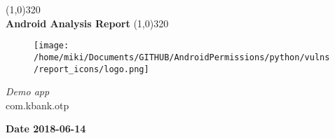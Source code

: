 \documentclass[12p]{article}
\begin{document}
\begin{titlepage}
\begin{center}
\line(1,0){320}\\
[0.25in]
\huge{\bfseries Android Analysis Report}
\line(1,0){320}\\
[0.5in]
\begin{figure}[H]
	\centering
	\texttt{[image: /home/miki/Documents/GITHUB/AndroidPermissions/python/vulns/report\_icons/logo.png]}
\end{figure}
\textsl{\LARGE Demo app}\\
\textsf{\LARGE com.kbank.otp}\\
[2.5in]
\end{center}
\begin{flushright}
\textbf{\large Date 2018-06-14}
\end{flushright}
\end{titlepage}
\tableofcontents
\thispagestyle{empty}
\cleardoublepage
\setcounter{page}{1}
\end{document}
